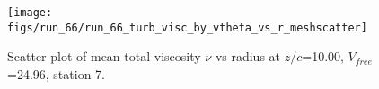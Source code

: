 \begin{figure}[H]
\centering
\texttt{[image: figs/run\_66/run\_66\_turb\_visc\_by\_vtheta\_vs\_r\_meshscatter]}
\caption{Scatter plot of mean total viscosity $\nu$ vs radius at $z/c$=10.00, $V_{free}$=24.96, station 7.}
\label{fig:run_66_turb_visc_by_vtheta_vs_r_meshscatter}
\end{figure}


